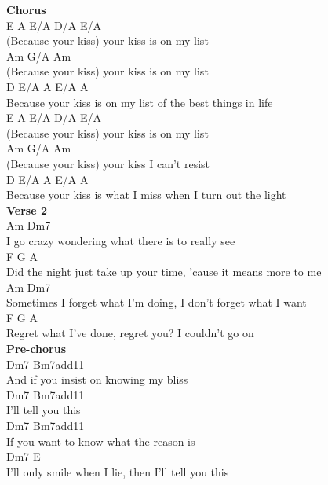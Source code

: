 \documentclass[a4paper]{article}
\begin{document}
{{        }
        \textbf{Chorus}
        ~\\
        {
            \cutive
            \obeyspaces
E             A     E/A          D/A   E/A
\\
(Because your kiss) your kiss is on my list
\\
Am                  G/A          Am
\\
(Because your kiss) your kiss is on my list
\\
              D                                       E/A A E/A A
\\
Because your kiss is on my list of the best things in life
\\
E             A     E/A          D/A   E/A
\\
(Because your kiss) your kiss is on my list
\\
Am                  G/A          Am
\\
(Because your kiss) your kiss I can't resist
\\
             D                                        E/A A E/A A
\\
Because your kiss is what I miss when I turn out the light
\\

        }
        \textbf{Verse 2}
        ~\\
        {
            \cutive
            \obeyspaces
      Am                                      Dm7
\\
I go crazy wondering what there is to really see
\\
F                               G                             A
\\
Did the night just take up your time, 'cause it means more to me
\\
    Am                                                   Dm7
\\
Sometimes I forget what I'm doing, I don't forget what I want
\\
  F                           G                  A
\\
Regret what I've done, regret you? I couldn't go on
\\

        }
        \textbf{Pre-chorus}
        ~\\
        {
            \cutive
            \obeyspaces
             Dm7                Bm7add11
\\
And if you insist on knowing my bliss
\\
Dm7            Bm7add11
\\
 I'll tell you this
\\
               Dm7                  Bm7add11
\\
If you want to know what the reason is
\\
          Dm7                         E
\\
I'll only smile when I lie, then I'll tell you this
\\

}}
\end{document}
